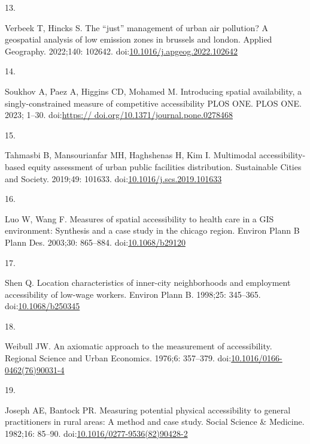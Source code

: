 \documentclass[10pt,letterpaper]{article}
\newlength{\cslhangindent}
\newlength{\csllabelwidth}
\newlength{\cslentryspacingunit} %
\newenvironment{CSLReferences}[2] %
 {%
  \setlength{\parindent}{0pt}
  \ifodd #1
  \let\oldpar\par
  \def\par{\hangindent=\cslhangindent\oldpar}
  \fi
  \setlength{\parskip}{#2\cslentryspacingunit}
 }%
 {}
\newcommand{\CSLLeftMargin}[1]{\parbox[t]{\csllabelwidth}{#1}}
\newcommand{\CSLRightInline}[1]{\parbox[t]{\linewidth - \csllabelwidth}{#1}\break}
\begin{document}
\begin{CSLReferences}{0}{0}
\leavevmode{}%
\CSLLeftMargin{13. }%
\CSLRightInline{Verbeek T, Hincks S. The {``just''} management of urban
air pollution? A geospatial analysis of low emission zones in brussels
and london. Applied Geography. 2022;140: 102642.
doi:\href{https://doi.org/10.1016/j.apgeog.2022.102642}{10.1016/j.apgeog.2022.102642}}

\leavevmode{}%
\CSLLeftMargin{14. }%
\CSLRightInline{Soukhov A, Paez A, Higgins CD, Mohamed M. Introducing
spatial availability, a singly-constrained measure of competitive
accessibility {\textbar} {PLOS} {ONE}. {PLOS} {ONE}. 2023; 1--30.
doi:\href{https://\%20doi.org/10.1371/journal.pone.0278468}{https://
doi.org/10.1371/journal.pone.0278468}}

\leavevmode{}%
\CSLLeftMargin{15. }%
\CSLRightInline{Tahmasbi B, Mansourianfar MH, Haghshenas H, Kim I.
Multimodal accessibility-based equity assessment of urban public
facilities distribution. Sustainable Cities and Society. 2019;49:
101633.
doi:\href{https://doi.org/10.1016/j.scs.2019.101633}{10.1016/j.scs.2019.101633}}

\leavevmode{}%
\CSLLeftMargin{16. }%
\CSLRightInline{Luo W, Wang F. Measures of spatial accessibility to
health care in a {GIS} environment: Synthesis and a case study in the
chicago region. Environ Plann B Plann Des. 2003;30: 865--884.
doi:\href{https://doi.org/10.1068/b29120}{10.1068/b29120}}

\leavevmode{}%
\CSLLeftMargin{17. }%
\CSLRightInline{Shen Q. Location characteristics of inner-city
neighborhoods and employment accessibility of low-wage workers. Environ
Plann B. 1998;25: 345--365.
doi:\href{https://doi.org/10.1068/b250345}{10.1068/b250345}}

\leavevmode{}%
\CSLLeftMargin{18. }%
\CSLRightInline{Weibull JW. An axiomatic approach to the measurement of
accessibility. Regional Science and Urban Economics. 1976;6: 357--379.
doi:\href{https://doi.org/10.1016/0166-0462(76)90031-4}{10.1016/0166-0462(76)90031-4}}

\leavevmode{}%
\CSLLeftMargin{19. }%
\CSLRightInline{Joseph AE, Bantock PR. Measuring potential physical
accessibility to general practitioners in rural areas: A method and case
study. Social Science \& Medicine. 1982;16: 85--90.
doi:\href{https://doi.org/10.1016/0277-9536(82)90428-2}{10.1016/0277-9536(82)90428-2}}


\end{CSLReferences}
\end{document}
